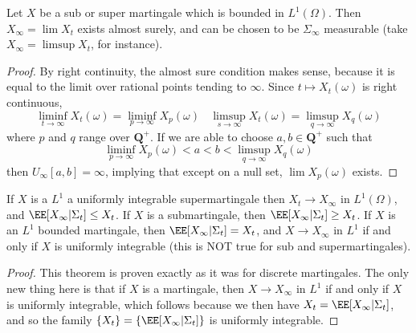 \begin{theorem}
    Let $X$ be a \cadlag sub or super martingale which is bounded in $L^1(\Omega)$. Then $X_\infty = \lim X_t$ exists almost surely, and can be chosen to be $\Sigma_\infty$ measurable (take $X_\infty = \limsup X_t$, for instance).
\end{theorem}
\begin{proof}
    By right continuity, the almost sure condition makes sense, because it is equal to the limit over rational points tending to $\infty$. Since $t \mapsto X_t(\omega)$ is right continuous,
    \[ \liminf_{t \to \infty} X_t(\omega) = \liminf_{p \to \infty} X_p(\omega)\ \ \ \ \limsup_{s \to \infty} X_t(\omega) = \limsup_{q \to \infty} X_q(\omega) \]
    where $p$ and $q$ range over $\mathbf{Q}^+$. If we are able to choose $a,b \in \mathbf{Q}^+$ such that
    \[ \liminf_{p \to \infty} X_p(\omega) < a < b < \limsup_{q \to \infty} X_q(\omega) \]
    then $U_\infty[a,b] = \infty$, implying that except on a null set, $\lim X_p(\omega)$ exists.
\end{proof}

\begin{theorem}
    If $X$ is a $L^1$ a uniformly integrable supermartingale then $X_t \to X_\infty$ in $L^1(\Omega)$, and $\EE[X_\infty|\Sigma_t] \leq X_t$. If $X$ is a submartingale, then $\EE[X_\infty|\Sigma_t] \geq X_t$. If $X$ is an $L^1$ bounded martingale, then $\EE[X_\infty|\Sigma_t] = X_t$, and $X \to X_\infty$ in $L^1$ if and only if $X$ is uniformly integrable (this is NOT true for sub and supermartingales).
\end{theorem}
\begin{proof}
    This theorem is proven exactly as it was for discrete martingales. The only new thing here is that if $X$ is a martingale, then $X \to X_\infty$ in $L^1$ if and only if $X$ is uniformly integrable, which follows because we then have $X_t = \EE[X_\infty|\Sigma_t]$, and so the family $\{ X_t \} = \{ \EE[X_\infty|\Sigma_t] \}$ is uniformly integrable.
\end{proof}

